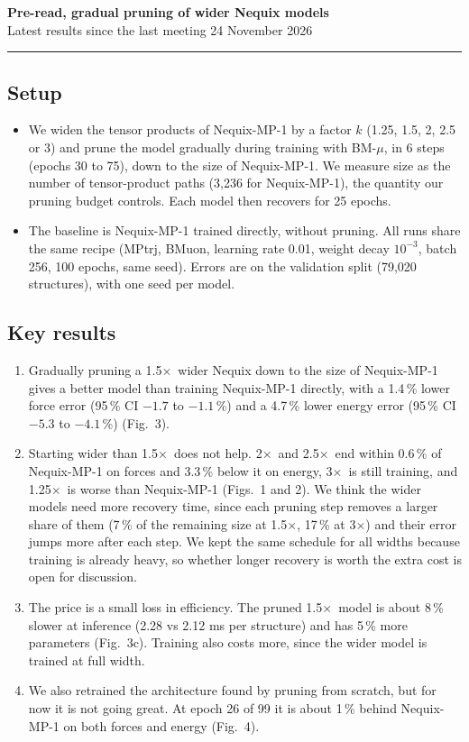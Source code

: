 \documentclass[10pt,a4paper]{article}
\newcommand{\x}{$\times$}
\begin{document}
{\Large\bfseries Pre-read, gradual pruning of wider Nequix models}\\[2pt]
{\large Latest results since the last meeting \hfill 24 November 2026}
\par\smallskip\hrule

\subsection*{Setup}
\begin{itemize}
  \item We widen the tensor products of Nequix-MP-1 by a factor $k$ (1.25, 1.5, 2, 2.5 or 3) and prune the model
        gradually during training with BM-$\mu$, in 6 steps (epochs 30 to 75), down to the size of Nequix-MP-1.
        We measure size as the number of tensor-product paths (3,236 for Nequix-MP-1), the quantity our pruning
        budget controls. Each model then recovers for 25 epochs.
  \item The baseline is Nequix-MP-1 trained directly, without pruning. All runs share the same recipe (MPtrj, BMuon,
        learning rate 0.01, weight decay $10^{-3}$, batch 256, 100 epochs, same seed). Errors are on the validation
        split (79,020 structures), with one seed per model.
\end{itemize}

\subsection*{Key results}
\begin{enumerate}
  \item Gradually pruning a 1.5\x\ wider Nequix down to the size of Nequix-MP-1 gives a better model than training
        Nequix-MP-1 directly, with a 1.4\,\% lower force error (95\,\% CI $-1.7$ to $-1.1$\,\%) and a 4.7\,\% lower
        energy error (95\,\% CI $-5.3$ to $-4.1$\,\%) (Fig.~3).
  \item Starting wider than 1.5\x\ does not help. 2\x\ and 2.5\x\ end within 0.6\,\% of Nequix-MP-1 on forces and
        3.3\,\% below it on energy, 3\x\ is still training, and 1.25\x\ is worse than Nequix-MP-1 (Figs.~1 and 2).
        We think the wider models need more recovery time, since each pruning step removes a larger share of them
        (7\,\% of the remaining size at 1.5\x, 17\,\% at 3\x) and their error jumps more after each step.
        We kept the same schedule for all widths because training is already heavy, so whether longer recovery is
        worth the extra cost is open for discussion.
  \item The price is a small loss in efficiency. The pruned 1.5\x\ model is about 8\,\% slower at inference (2.28 vs
        2.12 ms per structure) and has 5\,\% more parameters (Fig.~3c). Training also costs more, since the wider model
        is trained at full width.
  \item We also retrained the architecture found by pruning from scratch, but for now it is not going great. At epoch 26
        of 99 it is about 1\,\% behind Nequix-MP-1 on both forces and energy (Fig.~4).
\end{enumerate}
\end{document}

